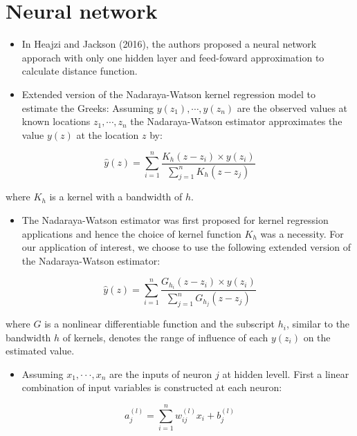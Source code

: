 \chapter{Neural network}

		\begin{itemize}
			\setlength\itemsep{0,5em}
			\item In Heajzi and Jackson (2016), the authors proposed a neural network apporach with only one hidden layer and feed-foward approximation to calculate distance function.
			\item Extended version of the Nadaraya-Watson kernel regression model to estimate the Greeks: Assuming $y\left(z_{1}\right), \cdots, y\left(z_{n}\right)$  are  the observed values at known locations $z_{1}, \cdots, z_{n}$ the Nadaraya-Watson estimator approximates the value $y(z)$ at the location $z$ by:
		\end{itemize}			 			 
		\begin{equation}
\hat{y}(z)=\sum_{i=1}^{n} \frac{K_{h}\left(z-z_{i}\right) \times y\left(z_{i}\right)}{\sum_{j=1}^{n} K_{h}\left(z-z_{j}\right)}
		\end{equation}
		
		\;\;\;\;\;\;\centering where $K_h$ is a kernel with a bandwidth of $h$.
		 
		\begin{itemize}
			\setlength\itemsep{0,5em}
			\item The Nadaraya-Watson estimator was first proposed for kernel regression applications and hence the choice of kernel function $K_h$ was a necessity.  For our application of interest, we choose to use the following extended version of the Nadaraya-Watson estimator:
		\end{itemize}			 			 
		\begin{equation}
\hat{y}(z)=\sum_{i=1}^{n} \frac{G_{h_{i}}\left(z-z_{i}\right) \times y\left(z_{i}\right)}{\sum_{j=1}^{n} G_{h_{j}}\left(z-z_{j}\right)}
		\end{equation}
		
		\;\;\;\;\;\;\centering where $G$ is a nonlinear differentiable function and the subscript $h_i$, similar to the bandwidth $h$ of kernels, denotes the range of influence of each $y(z_i)$ on  the  estimated  value.
		 
		\begin{itemize}
			\setlength\itemsep{0,5em}
			\item Assuming $x_1,···,x_n$ are the inputs of neuron $j$ at hidden levell.  First a linear combination of input variables is constructed at each neuron:
		\end{itemize}			 			 
		\begin{equation}
		a_{j}^{(l)}=\sum_{i=1}^{n} w_{i j}^{(l)} x_{i}+b_{j}^{(l)}
		\end{equation}
		
